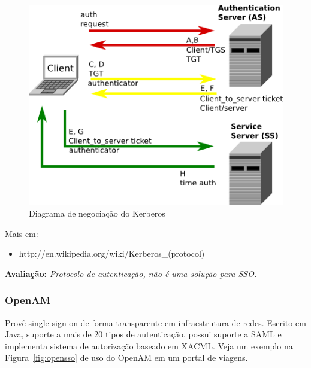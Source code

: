 \documentclass[11pt]{article}
\begin{document}
\begin{figure}[h]
\center
\includegraphics[scale=0.6]{kerberos.png}
\caption{Diagrama de negociação do Kerberos}
\label{fig:kerberos}
\end{figure}

Mais em:
\begin{itemize}
  \item{http://en.wikipedia.org/wiki/Kerberos\_(protocol)}
\end{itemize}

{\bf Avaliação:} {\it Protocolo de autenticação, não é uma solução para SSO.}

\subsubsection{OpenAM}

Provê single sign-on de forma transparente em infraestrutura de redes. Escrito
em Java, suporte a mais de 20 tipos de autenticação, possui suporte a SAML e
implementa sistema de autorização baseado em XACML. Veja um exemplo na
Figura~\ref{fig:opensso} de uso do OpenAM em um portal de viagens.
\end{document}
